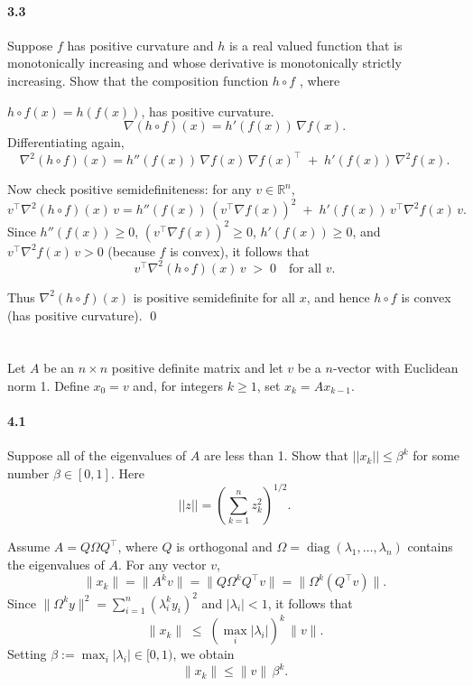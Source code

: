 \documentclass[a4paper]{article}
\begin{document}
\paragraph{3.3}
Suppose $f$ has positive curvature and $h$ is a real valued function that is monotonically increasing and
whose derivative is monotonically strictly increasing. Show that the composition function $h \circ f$ , where

$h \circ f (x) = h(f (x))$, has positive curvature.
$$\nabla (h\circ f)(x) = h'(f(x))\, \nabla f(x).$$
Differentiating again,
$$\nabla^2 (h\circ f)(x) = h''(f(x))\, \nabla f(x)\,\nabla f(x)^\top \;+\; h'(f(x))\, \nabla^2 f(x).$$

Now check positive semidefiniteness: for any $v \in \mathbb{R}^n$,
\[
v^\top \nabla^2 (h\circ f)(x)\, v
= h''(f(x))\, (v^\top \nabla f(x))^2 \;+\; h'(f(x))\, v^\top \nabla^2 f(x)\, v.
\]
Since $h''(f(x)) \ge 0$, $(v^\top \nabla f(x))^2 \ge 0$, $h'(f(x)) \ge 0$, and $v^\top \nabla^2 f(x)\, v > 0$ (because $f$ is convex), it follows that
\[
v^\top \nabla^2 (h\circ f)(x)\, v \; >\; 0 \quad \text{for all } v.
\]

Thus $\nabla^2 (h\circ f)(x)$ is positive semidefinite for all $x$, and hence $h\circ f$ is convex (has positive curvature).
\qed

\section{}
Let $A$ be an $n \times n$ positive definite matrix and let $v$ be a $n$-vector with Euclidean norm 1.
Define $x_0 = v$ and, for integers $k \geq 1$, set $x_k = Ax_{k-1}.$
\paragraph{4.1}
Suppose all of the eigenvalues of $A$ are less than 1.
Show that $||x_k || \leq \beta^k$ for some number $\beta \in [0, 1]$.
Here
$$||z|| = \left( \sum_{k=1}^n z_k^2 \right)^{1/2}.$$

Assume $A = Q \Omega Q^\top$, where $Q$ is orthogonal and $\Omega = \operatorname{diag}(\lambda_1,\dots,\lambda_n)$ contains the eigenvalues of $A$.
For any vector $v$,
\[
\|x_k\| = \|A^k v\| = \|Q \Omega^k Q^\top v\| = \|\Omega^k (Q^\top v)\|.
\]
Since $\|\Omega^k y\|^2 = \sum_{i=1}^n (\lambda_i^k y_i)^2$ and $|\lambda_i| < 1$, it follows that
\[
\|x_k\| \;\le\; (\max_i |\lambda_i|)^k \,\|v\|.
\]
Setting $\beta := \max_i |\lambda_i| \in [0,1)$, we obtain
\[
\|x_k\| \le \|v\|\, \beta^k.
\]
\end{document}
